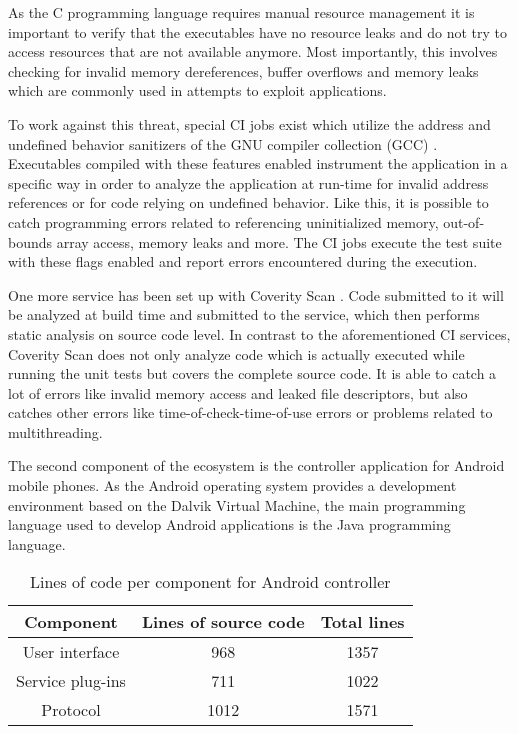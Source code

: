 As the C programming language requires manual resource management it is important to verify that the executables have no resource leaks and do not try to access resources that are not available anymore.
Most importantly, this involves checking for invalid memory dereferences, buffer overflows and memory leaks which are commonly used in attempts to exploit applications.

To work against this threat, special CI jobs exist which utilize the address and undefined behavior sanitizers of the GNU compiler collection (GCC) \cite{gcc}.
Executables compiled with these features enabled instrument the application in a specific way in order to analyze the application at run-time for invalid address references or for code relying on undefined behavior.
Like this, it is possible to catch programming errors related to referencing uninitialized memory, out-of-bounds array access, memory leaks and more.
The CI jobs execute the test suite with these flags enabled and report errors encountered during the execution.

One more service has been set up with Coverity Scan \cite{coverity}.
Code submitted to it will be analyzed at build time and submitted to the service, which then performs static analysis on source code level.
In contrast to the aforementioned CI services, Coverity Scan does not only analyze code which is actually executed while running the unit tests but covers the complete source code.
It is able to catch a lot of errors like invalid memory access and leaked file descriptors, but also catches other errors like time-of-check-time-of-use errors or problems related to multithreading.

\bigskip

The second component of the ecosystem is the controller application for Android mobile phones.
As the Android operating system provides a development environment based on the Dalvik Virtual Machine, the main programming language used to develop Android applications is the Java programming language.

\begin{table}[t]
    \centering
    \begin{tabular}{|c|c|c|}
        \hline
        \bfseries Component & \bfseries Lines of source code & \bfseries Total lines\\
        \hline
        User interface & 968 & 1357\\
        \hline
        Service plug-ins & 711 & 1022\\
        \hline
        Protocol & 1012 & 1571\\
        \hline
    \end{tabular}
    \caption{Lines of code per component for Android controller}
    \label{tab:sloc-controller}
\end{table}

